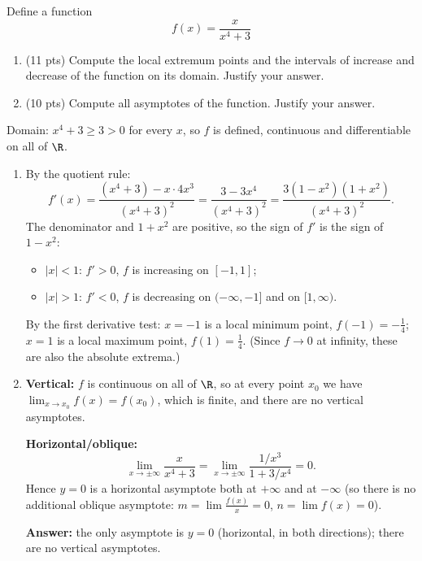 
\begin{question}
Define a function
\[ f(x) = \frac{x}{x^4 + 3} \]
\begin{enumerate}
  \item (11 pts) Compute the local extremum points and the intervals of increase and decrease of the function on its domain. Justify your answer.
  \item (10 pts) Compute all asymptotes of the function. Justify your answer.
\end{enumerate}
\end{question}

\begin{solution}
Domain: $x^4 + 3 \ge 3 > 0$ for every $x$, so $f$ is defined, continuous and differentiable on all of $\R$.
\begin{enumerate}
  \item By the quotient rule:
  \[ f'(x) = \frac{(x^4 + 3) - x\cdot 4x^3}{(x^4+3)^2} = \frac{3 - 3x^4}{(x^4 + 3)^2} = \frac{3(1 - x^2)(1 + x^2)}{(x^4+3)^2}. \]
  The denominator and $1 + x^2$ are positive, so the sign of $f'$ is the sign of $1 - x^2$:
  \begin{itemize}
    \item $|x| < 1$: $f' > 0$, $f$ is increasing on $[-1, 1]$;
    \item $|x| > 1$: $f' < 0$, $f$ is decreasing on $(-\infty, -1]$ and on $[1, \infty)$.
  \end{itemize}
  By the first derivative test: $x=-1$ is a local minimum point, $f(-1) = -\frac14$; $x = 1$ is a local maximum point, $f(1) = \frac14$.
  (Since $f\to0$ at infinity, these are also the absolute extrema.)

  \item \textbf{Vertical:} $f$ is continuous on all of $\R$, so at every point $x_0$ we have $\lim_{x\to x_0}f(x) = f(x_0)$, which is finite, and there are no vertical asymptotes.

  \textbf{Horizontal/oblique:}
  \[ \lim_{x\to\pm\infty}\frac{x}{x^4 + 3} = \lim_{x\to\pm\infty}\frac{1/x^3}{1 + 3/x^4} = 0. \]
  Hence $y = 0$ is a horizontal asymptote both at $+\infty$ and at $-\infty$ (so there is no additional oblique asymptote: $m = \lim \frac{f(x)}{x} = 0$, $n = \lim f(x) = 0$).

  \textbf{Answer:} the only asymptote is $y = 0$ (horizontal, in both directions); there are no vertical asymptotes.
\end{enumerate}
\end{solution}
